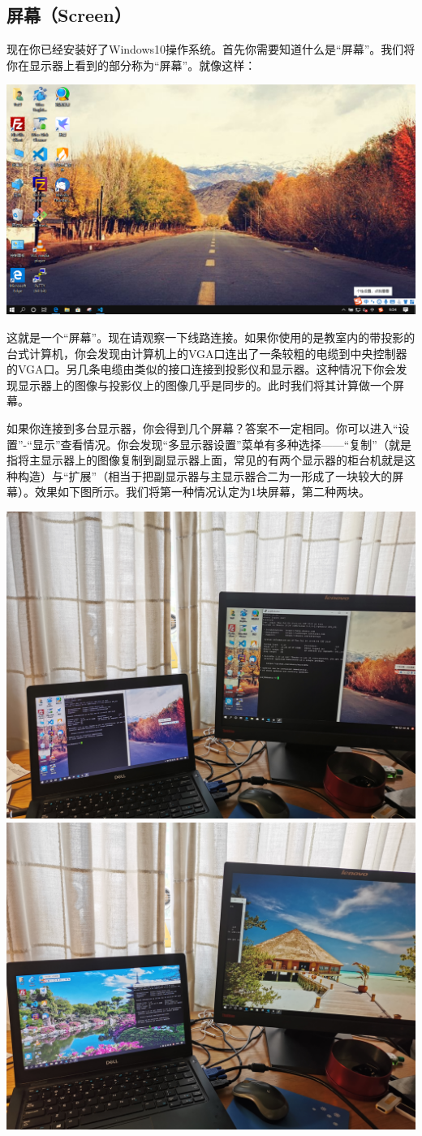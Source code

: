 \subsection{屏幕（Screen）}
现在你已经安装好了Windows10操作系统。首先你需要知道什么是“屏幕”。我们将你在显示器上看到的部分称为“屏幕”。就像这样：
\begin{center}
	\includegraphics[width=0.7\linewidth]{pic/screen}
\end{center} \par
这就是一个“屏幕”。现在请观察一下线路连接。如果你使用的是教室内的带投影的台式计算机，你会发现由计算机上的VGA口连出了一条较粗的电缆到中央控制器的VGA口。另几条电缆由类似的接口连接到投影仪和显示器。这种情况下你会发现显示器上的图像与投影仪上的图像几乎是同步的。此时我们将其计算做一个屏幕。\par
如果你连接到多台显示器，你会得到几个屏幕？答案不一定相同。你可以进入“设置”-“显示”查看情况。你会发现“多显示器设置”菜单有多种选择——“复制”（就是指将主显示器上的图像复制到副显示器上面，常见的有两个显示器的柜台机就是这种构造）与“扩展”（相当于把副显示器与主显示器合二为一形成了一块较大的屏幕）。效果如下图所示。我们将第一种情况认定为1块屏幕，第二种两块。
\begin{center}
	\includegraphics[width=0.7\linewidth]{pic/ScrCopy}\\
	\includegraphics[width=0.7\linewidth]{pic/ScrExtend}
\end{center} 
